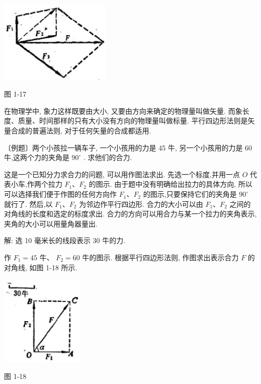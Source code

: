 \documentclass[10pt]{article}
\begin{document}
\begin{center}
\includegraphics[max width=0.4\textwidth]{images/01912d55-147c-70aa-b0e0-1782a122f948_31_250501.jpg}
\end{center}

图 1-17

在物理学中, 象力这样既要由大小, 又要由方向来确定的物理量叫做矢量. 而象长度、质量、时间那样的只有大小没有方向的物理量叫做标量. 平行四边形法则是矢量合成的普遍法则, 对于任何矢量的合成都适用.

〔例题〕两个小孩拉一辆车子, 一个小孩用的力是 45 牛, 另一个小孩用的力是 60 牛,这两个力的夹角是 \({90}^{ \circ }\) . 求他们的合力.

这是一个已知分力求合力的问题, 可以用作图法求出. 先选一个标度,并用一点 \(O\) 代表小车,作两个拉力 \({F}_{1}\text{、}{F}_{2}\) 的图示. 由于题中没有明确给出拉力的具体方向, 所以可以选择我们便于作图的任何方向作 \({F}_{1}\text{、}{F}_{2}\) 的图示,只要保持它们的夹角是 \({90}^{ \circ }\) 就行了. 然后,以 \({F}_{1}\text{、}{F}_{2}\) 为邻边作平行四边形. 合力的大小可以由 \({F}_{1}\text{、}{F}_{2}\) 之间的对角线的长度和选定的标度求出. 合力的方向可以用合力与某一个拉力的夹角表示, 夹角的大小可以用量角器量出.

解: 选 10 毫米长的线段表示 30 牛的力.

作 \({F}_{1} = {45}\) 牛、 \({F}_{2} = {60}\) 牛的图示. 根据平行四边形法则, 作图求出表示合力 \(F\) 的对角线, 如图 1-18 所示.

\begin{center}
\includegraphics[max width=0.3\textwidth]{images/01912d55-147c-70aa-b0e0-1782a122f948_32_520124.jpg}
\end{center}

图 1-18
\end{document}
